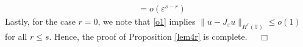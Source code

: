 \documentclass[12pt,reqno]{amsart}
\newcommand{\zz}{\mathbb{Z}}
\newcommand{\ci}{\mathbb{T}}
\newcommand{\ee}{\varepsilon}
\theoremstyle{plain}  %
\theoremstyle{definition}
\begin{document}
\begin{appendices}
\begin{equation*}
\begin{split}
		& = o(\ee^{s-r})
	\end{split}
\end{equation*}
Lastly, for the case $r=0$, we note that \eqref{o1} implies $\|u - J_\ee u
\|_{H^r(\ci)} \le o(1)$ for all $r \le s$. Hence, the proof of Proposition
\ref{lem4r} is complete.  $\quad \Box$
\vskip0.1in
%
%
%
%
%
%
%
%
%
%
%
%
%
%
%
%
%
%
%
%
%


\end{appendices}
\end{document}
